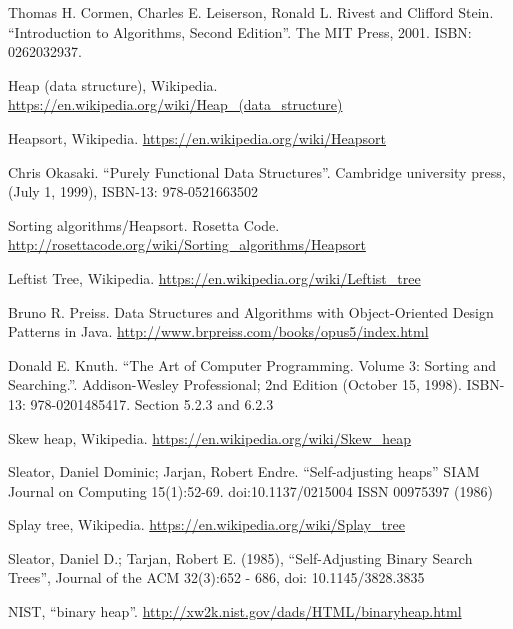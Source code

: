 \documentclass[b5paper]{article}
\begin{document}
\begin{thebibliography}{99}

Thomas H. Cormen, Charles E. Leiserson, Ronald L. Rivest and Clifford Stein. ``Introduction to Algorithms, Second Edition''. The MIT Press, 2001. ISBN: 0262032937.

Heap (data structure), Wikipedia. \url{https://en.wikipedia.org/wiki/Heap_(data_structure)}

Heapsort, Wikipedia. \url{https://en.wikipedia.org/wiki/Heapsort}

Chris Okasaki. ``Purely Functional Data Structures''. Cambridge university press, (July 1, 1999), ISBN-13: 978-0521663502

Sorting algorithms/Heapsort. Rosetta Code. \url{http://rosettacode.org/wiki/Sorting_algorithms/Heapsort}

Leftist Tree, Wikipedia. \url{https://en.wikipedia.org/wiki/Leftist_tree}

Bruno R. Preiss. Data Structures and Algorithms with Object-Oriented Design Patterns in Java. \url{http://www.brpreiss.com/books/opus5/index.html}

Donald E. Knuth. ``The Art of Computer Programming. Volume 3: Sorting and Searching.''. Addison-Wesley Professional;
2nd Edition (October 15, 1998). ISBN-13: 978-0201485417. Section 5.2.3 and 6.2.3

Skew heap, Wikipedia. \url{https://en.wikipedia.org/wiki/Skew_heap}

Sleator, Daniel Dominic; Jarjan, Robert Endre. ``Self-adjusting heaps'' SIAM Journal on Computing 15(1):52-69. doi:10.1137/0215004 ISSN 00975397 (1986)

Splay tree, Wikipedia. \url{https://en.wikipedia.org/wiki/Splay_tree}

Sleator, Daniel D.; Tarjan, Robert E. (1985), ``Self-Adjusting Binary Search Trees'', Journal of the ACM 32(3):652 - 686, doi: 10.1145/3828.3835

NIST, ``binary heap''. \url{http://xw2k.nist.gov/dads/HTML/binaryheap.html}

\end{thebibliography}

\expandafter\enddocument
\fi
\end{document}
